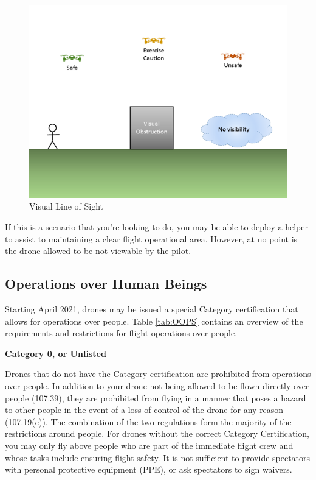\documentclass[
  12pt,
]{book}
\begin{document}
\begin{figure}

{\centering \includegraphics[width=0.8\linewidth]{images/VLOS_G} 

}

\caption{Visual Line of Sight}\label{fig:vlos}
\end{figure}

If this is a scenario that you're looking to do, you may be able to deploy a helper to assist to maintaining a clear flight operational area. However, at no point is the drone allowed to be not viewable by the pilot.

\subsection{Operations over Human Beings}\label{operations-over-human-beings}

Starting April 2021, drones may be issued a special Category certification that allows for operations over people. Table \ref{tab:OOPS} contains an overview of the requirements and restrictions for flight operations over people.

\textbf{Category 0, or Unlisted}

Drones that do not have the Category certification are prohibited from operations over people. In addition to your drone not being allowed to be flown directly over people (107.39), they are prohibited from flying in a manner that poses a hazard to other people in the event of a loss of control of the drone for any reason (107.19(c)). The combination of the two regulations form the majority of the restrictions around people. For drones without the correct Category Certification, you may only fly above people who are part of the immediate flight crew and whose tasks include ensuring flight safety. It is not sufficient to provide spectators with personal protective equipment (PPE), or ask spectators to sign waivers.
\end{document}

